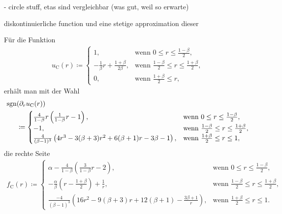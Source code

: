   - circle stuff, etas sind vergleichbar (was gut, weil so erwarte)

diskontinuierliche function und eine stetige approximation dieser

Für die Funktion
\begin{align*}
  u_\textrm{C}(r)\coloneqq 
  \begin{cases}
    1, & \text{wenn } 0\leq r\leq\frac{1-\beta}{2},\\
    -\frac{1}{\beta}r + \frac{1+\beta}{2\beta}, & 
    \text{wenn } \frac{1-\beta}{2}\leq r\leq \frac{1+\beta}{2},\\
    0, & \text{wenn } \frac{1+\beta}{2}\leq r,
  \end{cases}
\end{align*}
erhält man mit der Wahl
\begin{align*}
  \operatorname{sgn}&(\partial_r u_\textrm{C}(r)) \\
  &\coloneqq 
  \begin{cases}
    \frac{4}{1-\beta}r\left(\frac{1}{1-\beta}r -1\right), &
    \text{wenn } 0\leq r\leq\frac{1-\beta}{2},\\
    -1, & \text{wenn } \frac{1-\beta}{2}\leq r\leq \frac{1+\beta}{2},\\
    \frac{4}{(\beta-1)^3}
    \left( 4r^3-3(\beta+3)r^2 +6(\beta+1)r-3\beta-1\right), & 
    \text{wenn } \frac{1+\beta}{2}\leq r\leq 1,
  \end{cases}
\end{align*}
die rechte Seite
\begin{align*}
  f_\textrm{C}(r)\coloneqq 
  \begin{cases}
    \alpha - \frac{4}{1-\beta}\left(\frac{3}{1-\beta}r - 2\right), &
    \text{wenn } 0\leq r\leq\frac{1-\beta}{2},\\
    -\frac{\alpha}{\beta}\left( r-\frac{1+\beta}{2} \right) +\frac{1}{r}, & 
    \text{wenn } \frac{1-\beta}{2}\leq r\leq \frac{1+\beta}{2},\\
    \frac{-4}{(\beta-1)^3}
    \left( 16r^2 -9(\beta+3)r + 12(\beta+1) - \frac{3\beta+1}{r}\right), & 
    \text{wenn } \frac{1+\beta}{2}\leq r\leq 1.
  \end{cases}
\end{align*}

